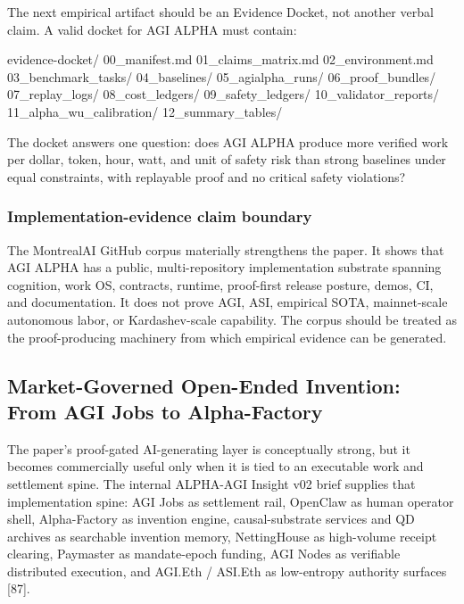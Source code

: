 \documentclass[
  11pt,
]{article}
\newenvironment{Shaded}{}{}
\newcommand{\NormalTok}[1]{#1}
\begin{document}
The next empirical artifact should be an Evidence Docket, not another
verbal claim. A valid docket for AGI ALPHA must contain:

\begin{Shaded}
\begin{Highlighting}[]
\NormalTok{evidence{-}docket/}
\NormalTok{  00\_manifest.md}
\NormalTok{  01\_claims\_matrix.md}
\NormalTok{  02\_environment.md}
\NormalTok{  03\_benchmark\_tasks/}
\NormalTok{  04\_baselines/}
\NormalTok{  05\_agialpha\_runs/}
\NormalTok{  06\_proof\_bundles/}
\NormalTok{  07\_replay\_logs/}
\NormalTok{  08\_cost\_ledgers/}
\NormalTok{  09\_safety\_ledgers/}
\NormalTok{  10\_validator\_reports/}
\NormalTok{  11\_alpha\_wu\_calibration/}
\NormalTok{  12\_summary\_tables/}
\end{Highlighting}
\end{Shaded}

The docket answers one question: does AGI ALPHA produce more verified
work per dollar, token, hour, watt, and unit of safety risk than strong
baselines under equal constraints, with replayable proof and no critical
safety violations?

\subsubsection{Implementation-evidence claim
boundary}\label{implementation-evidence-claim-boundary}

The MontrealAI GitHub corpus materially strengthens the paper. It shows
that AGI ALPHA has a public, multi-repository implementation substrate
spanning cognition, work OS, contracts, runtime, proof-first release
posture, demos, CI, and documentation. It does not prove AGI, ASI,
empirical SOTA, mainnet-scale autonomous labor, or Kardashev-scale
capability. The corpus should be treated as the proof-producing
machinery from which empirical evidence can be generated.

\subsection{Market-Governed Open-Ended Invention: From AGI Jobs to
Alpha-Factory}\label{market-governed-open-ended-invention-from-agi-jobs-to-alpha-factory}

The paper's proof-gated AI-generating layer is conceptually strong, but
it becomes commercially useful only when it is tied to an executable
work and settlement spine. The internal ALPHA-AGI Insight v02 brief
supplies that implementation spine: AGI Jobs as settlement rail,
OpenClaw as human operator shell, Alpha-Factory as invention engine,
causal-substrate services and QD archives as searchable invention
memory, NettingHouse as high-volume receipt clearing, Paymaster as
mandate-epoch funding, AGI Nodes as verifiable distributed execution,
and AGI.Eth / ASI.Eth as low-entropy authority surfaces {[}87{]}.
\end{document}
